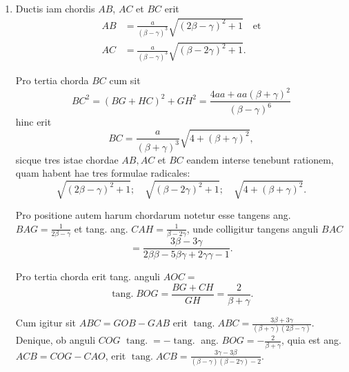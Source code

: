 \documentclass[10pt,a4paper]{article}
\DeclareMathOperator{\tang}{tang.}
\begin{document}
\begin{paracol}{2}
\begin{enumerate}[topsep=1px]
		\item Ductis iam chordis $AB$, $AC$ et $BC$ erit 
		\begin{align*}
			AB &= \frac{a}{(\beta-\gamma)^3}\sqrt{(2\beta-\gamma)^2 +1} \quad \text{et}\\
			AC & = \frac{a}{(\beta-\gamma)^3}\sqrt{(\beta - 2\gamma)^2+1}.
		\end{align*}
		\par Pro tertia chorda $BC$ cum sit
		\[
			BC^2 = (BG + HC)^2 + GH^2 = \frac{4aa+aa(\beta+ \gamma)^2}{(\beta - \gamma )^6}
		\]
		hinc erit
		\[
			BC = \frac{a}{(\beta+\gamma)^3} \sqrt{4+(\beta+\gamma)^2},
		\]
		sicque tres istae chordae $AB, AC$ et $BC$ eandem interse tenebunt rationem, quam habent hae tres formulae radicales:
		\[
			\sqrt{(2\beta-\gamma)^2+1}; \quad \sqrt{(\beta-2\gamma)^2+1}; \quad \sqrt{4+(\beta+\gamma)^2}.
		\]
		\par Pro positione autem harum chordarum notetur esse tangens ang. $BAG = \frac{1}{2\beta- \gamma}$ et tang. ang. $CAH = \frac{1}{\beta - 2\gamma}$, unde colligitur tangens anguli $BAC$
		\[
			= \frac{3\beta - 3\gamma}{2\beta \beta - 5\beta \gamma + 2\gamma \gamma -1}.
		\]
		\par Pro tertia chorda erit tang. anguli $AOC=$
		\[
			\tang BOG = \frac{BG + CH}{GH} = \frac{2}{\beta + \gamma}.
		\] 
		\par Cum igitur sit $ABC = GOB - GAB$ erit $\tang ABC = \frac{3\beta + 3\gamma}{(\beta+\gamma)(2\beta - \gamma)}$. Denique, ob anguli $COG$ $\tang = -\tang$ ang. $BOG = -\frac{2}{\beta+\gamma}$, quia est ang. $ACB = COG-CAO$, erit $\tang ACB = \frac{3\gamma-3\beta}{(\beta - \gamma)(\beta - 2\gamma)-2}$.
		

\end{enumerate}
\end{paracol}
\end{document}
